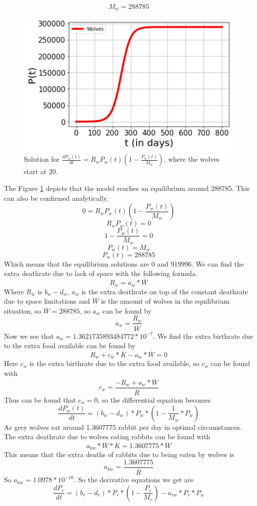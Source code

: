 \documentclass{article}
\begin{document}
$$M_w = 288785$$
\begin{figure}[h!]
    \centering
    \includegraphics[scale=0.78]{Pictures/Wolves.png}
    \caption{Solution for $\frac{dP_w(t)}{dt} = R_wP_w(t)(1-\frac{P_w(t)}{M_w})$, where the wolves start at $20$.}
    \label{fig:Wolves}
\end{figure}
The Figure \ref{fig:Wolves} depicts that the model reaches an equilibrium around 288785. This can also be confirmed analytically. 
$$0=R_wP_w(t)(1-\frac{P_w(t)}{M_w})$$
$$R_wP_w(t)=0$$
$$1-\frac{P_w(t)}{M_w}=0$$
$$P_w(t)=M_w$$
$$P_w(t)=288785$$
Which means that the equilibrium solutions are 0 and 919996. We can find the extra deathrate due to lack of space with the following formula.
$$R_w = a_w*\overline{W}$$
Where $R_w$ is $b_w-d_w$, $a_w$ is the extra deathrate on top of the constant deathrate due to space limitations and $\overline{W}$ is the amount of wolves in the equilibrium situation, so $\overline{W}=288785$, so $a_w$ can be found by
$$a_w = \frac{R_w}{\overline{W}}$$
Now we see that $a_w=1.3621735893484772*10^{-7}$. We find the extra birthrate due to the extra food available can be found by
$$R_w + c_w*\overline{K}-a_w*\overline{W}=0$$
Here $c_w$ is the extra birthrate due to the extra food available, so $c_w$ can be found with
$$c_w=\frac{-R_w+a_w*\overline{W}}{\overline{R}}$$
Thus can be found that $c_w=0$, so the differential equation becomes
$$\frac{dP_w(t)}{dt}=(b_w-d_w)*P_w*(1-\frac{1}{M_w}*P_w)$$
As grey wolves eat around 1.3607775 rabbit per day in optimal circumstances. The extra deathrate due to wolves eating rabbits can be found with
$$a_{kw}*\overline{W}*\overline{K}=1.3607775*\overline{W}$$
This means that the extra deaths of rabbits due to being eaten by wolves is 
$$a_{kw}=\frac{1.3607775}{\overline{R}}$$
So $a_{kw}=1.0978*10^{-10}$. So the derivative equations we get are
$$\frac{dP_r}{dt}=(b_r-d_r)*P_r*(1-\frac{P_r}{M_r})-a_{rw}*P_r*P_w$$
\end{document}
